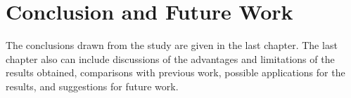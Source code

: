 \chapter{Conclusion and Future Work}

The conclusions drawn from the study are given in the last chapter.
The last chapter also can include discussions of the advantages and limitations of the results obtained, comparisons with previous work, possible applications for the results, and suggestions for future work.

